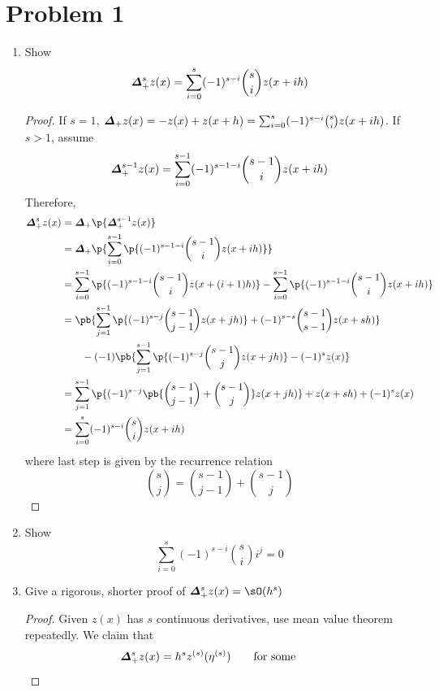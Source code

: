 \documentclass[11pt]{article}
\begin{document}
\section*{Problem 1}
\begin{enumerate}
    \item Show 
    \[
        \boldsymbol{\varDelta}_+^s z(x) = \sum_{i=0}^s (-1)^{s-i} \binom{s}{i} z(x+ih)
    \]
    \begin{proof}
        If $s=1$, $\boldsymbol{\varDelta}_+ z(x) = -z(x) + z(x+h) = \sum_{i=0}^s (-1)^{s-i} \binom{s}{i} z(x+ih)$. If $s>1$, assume
        \[
            \boldsymbol{\varDelta}_+^{s-1} z(x) = \sum_{i=0}^{s-1} (-1)^{s-1-i} \binom{s-1}{i} z(x+ih)
        \]
        Therefore,
        \begin{align*}
            \forw^s z(x)
                &= \forw \p{\forw^{s-1} z(x)} \\
                &= \forw \p{
                    \sum_{i=0}^{s-1} \p{(-1)^{s-1-i} \binom{s-1}{i} z(x+ih)}
                } \\ 
                &= \sum_{i=0}^{s-1} \p{(-1)^{s-1-i} \binom{s-1}{i} z(x+(i+1)h)}
                    - \sum_{i=0}^{s-1} \p{(-1)^{s-1-i} \binom{s-1}{i} z(x+ih)} \\
                &= \pb{
                    \sum_{j=1}^{s-1} \p{(-1)^{s-j} \binom{s-1}{j-1} z(x+jh)} + (-1)^{s-s} \binom{s-1}{s-1} z(x+sh)
                } \\ 
                &\quad\quad - (-1) \pb{
                    \sum_{j=1}^{s-1} \p{(-1)^{s-j} \binom{s-1}{j} z(x+jh)} - (-1)^{s} z(x)
                } \\
                &= \sum_{j=1}^{s-1} \p{(-1)^{s-j} \pb{ \binom{s-1}{j-1} + \binom{s-1}{j} } z(x+jh)}
                + z(x+sh)
                + (-1)^s z(x) \\
                &= \sum_{i=0}^s (-1)^{s-i} \binom{s}{i} z(x+ih)
        \end{align*}
        where last step is given by the recurrence relation 
        \[
            \binom{s}{j} = \binom{s-1}{j-1} + \binom{s-1}{j}
        \]
    \end{proof}
    \item Show 
    \[
        \sum_{i=0}^s (-1)^{s-i} \binom{s}{i} i^j = 0    
    \]
    \item Give a rigorous, shorter proof of $\forw^s z(x) = \sO(h^s)$
    \begin{proof}
        Given $z(x)$ has $s$ continuous derivatives, use mean value theorem repeatedly. We claim that 
        \[
            \boldsymbol{\varDelta}_+^s z(x) = h^s z^{(s)} (\eta^{(s)})
            \quad \quad \text{for some} \quad \quad 
\]
\end{proof}
\end{enumerate}
\end{document}
